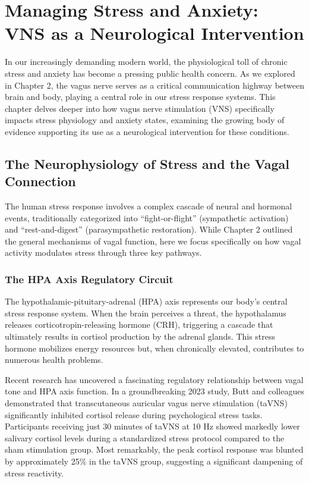 \documentclass[
  Letterpaper,
]{scrbook}
\begin{document}

\chapter{Managing Stress and Anxiety: VNS as a Neurological
Intervention}\label{managing-stress-and-anxiety-vns-as-a-neurological-intervention}

In our increasingly demanding modern world, the physiological toll of
chronic stress and anxiety has become a pressing public health concern.
As we explored in Chapter 2, the vagus nerve serves as a critical
communication highway between brain and body, playing a central role in
our stress response systems. This chapter delves deeper into how vagus
nerve stimulation (VNS) specifically impacts stress physiology and
anxiety states, examining the growing body of evidence supporting its
use as a neurological intervention for these conditions.

\section{The Neurophysiology of Stress and the Vagal
Connection}\label{the-neurophysiology-of-stress-and-the-vagal-connection}

The human stress response involves a complex cascade of neural and
hormonal events, traditionally categorized into ``fight-or-flight''
(sympathetic activation) and ``rest-and-digest'' (parasympathetic
restoration). While Chapter 2 outlined the general mechanisms of vagal
function, here we focus specifically on how vagal activity modulates
stress through three key pathways.

\subsection{The HPA Axis Regulatory
Circuit}\label{the-hpa-axis-regulatory-circuit}

The hypothalamic-pituitary-adrenal (HPA) axis represents our body's
central stress response system. When the brain perceives a threat, the
hypothalamus releases corticotropin-releasing hormone (CRH), triggering
a cascade that ultimately results in cortisol production by the adrenal
glands. This stress hormone mobilizes energy resources but, when
chronically elevated, contributes to numerous health problems.

Recent research has uncovered a fascinating regulatory relationship
between vagal tone and HPA axis function. In a groundbreaking 2023
study, Butt and colleagues demonstrated that transcutaneous auricular
vagus nerve stimulation (taVNS) significantly inhibited cortisol release
during psychological stress tasks. Participants receiving just 30
minutes of taVNS at 10 Hz showed markedly lower salivary cortisol levels
during a standardized stress protocol compared to the sham stimulation
group. Most remarkably, the peak cortisol response was blunted by
approximately 25\% in the taVNS group, suggesting a significant
dampening of stress reactivity.
\end{document}
